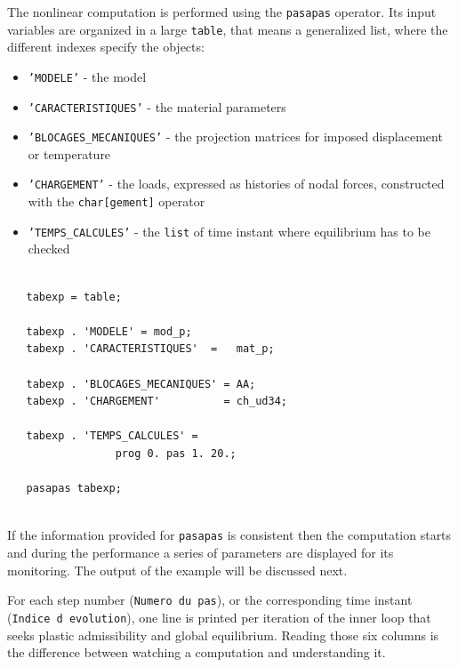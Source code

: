 \begin{castemcom}
The nonlinear computation is performed using the \texttt{pasapas} 
operator.
Its input variables are organized in a large \texttt{table}, 
that means a generalized list, where the different indexes 
specify the objects:
\begin{itemize}
  \item \texttt{'MODELE'} - the model
  \item \texttt{'CARACTERISTIQUES'} - the material parameters
  \item \texttt{'BLOCAGES\_MECANIQUES'} - the projection matrices for imposed displacement or temperature  
  \item \texttt{'CHARGEMENT'} - the loads, expressed as histories of nodal forces, constructed with 
      the \texttt{char[gement]} operator 
  \item \texttt{'TEMPS\_CALCULES'} - the \texttt{list} of time instant where equilibrium has to be checked
\end{itemize} 

\end{castemcom}
\begin{castemlines}
\begin{verbatim}

   tabexp = table;
      
   tabexp . 'MODELE' = mod_p;
   tabexp . 'CARACTERISTIQUES'  =   mat_p;

   tabexp . 'BLOCAGES_MECANIQUES' = AA;
   tabexp . 'CHARGEMENT'          = ch_ud34; 
 
   tabexp . 'TEMPS_CALCULES' =
                 prog 0. pas 1. 20.;

   pasapas tabexp; 


\end{verbatim}
\end{castemlines}

If the information provided for \texttt{pasapas} is consistent 
then the computation starts and during the performance a series 
of parameters are displayed for its monitoring. The output of the 
example will be discussed next. 

For each step number (\texttt{Numero du pas}), or the corresponding time
instant (\texttt{Indice d evolution}), one line is printed per iteration of
the inner loop that seeks plastic admissibility and global equilibrium.
Reading those six columns is the difference between watching a computation
and understanding it.

